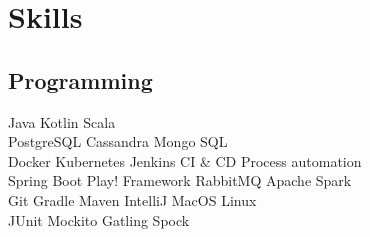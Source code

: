 \documentclass[]{deedy-resume-openfont}
\begin{document}
\begin{minipage}[t]{0.33\textwidth}
%


\section{Skills}
\subsection{Programming}
Java \textbullet{}
Kotlin \textbullet{}
Scala \\
PostgreSQL \textbullet{}   
Cassandra \textbullet{} 
Mongo \textbullet{} 
SQL \\
Docker \textbullet{} 
Kubernetes \textbullet{} 
Jenkins \textbullet{} 
CI \& CD Process automation\\
Spring Boot \textbullet{} 
Play! Framework \textbullet{} 
RabbitMQ \textbullet{} 
Apache Spark \\
Git \textbullet{} 
Gradle \textbullet{} 
Maven \textbullet{}
IntelliJ \textbullet{}
MacOS \textbullet{} 
Linux \\
JUnit \textbullet{} 
Mockito \textbullet{} 
Gatling \textbullet{} 
Spock \\
\sectionsep

\end{minipage}
\end{document}
